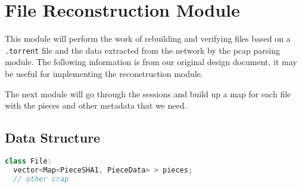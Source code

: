 \documentclass[11pt,titlepage]{article}
\begin{document}
\section{File Reconstruction Module}
This module will perform the work of rebuilding and verifying files based on a 
\texttt{.torrent} file and the data extracted from the network by the pcap 
parsing module. The following information is from our original design document, 
it may be useful for implementing the reconstruction module.

The next module will go through the sessions and build up a map for each file with
the pieces and other metadata that we need.

\subsection{Data Structure}
\begin{lstlisting}[language=C++]
class File:
  vector<Map<PieceSHA1, PieceData> > pieces;
  // other crap
\end{lstlisting}
\end{document}
